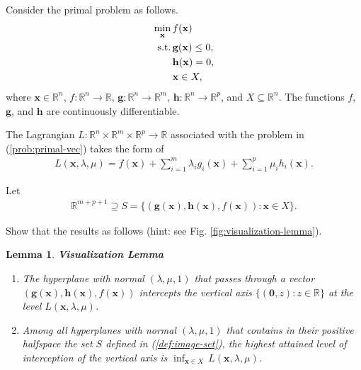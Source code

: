 \documentclass[11pt,letter,notitlepage]{article}
\newtheorem{lemma}{Lemma}
\begin{document}
\begin{solution}

\end{solution}

\newpage
\begin{exercise}
	Consider the primal problem as follows.
	\begin{align}\label{prob:primal-vec}
		\min_{\mathbf{x}}\, & f(\mathbf{x})                \\ \nonumber
		{\rm s.t.}\,        & \mathbf{g}(\mathbf{x})\leq0, \\ \nonumber
		                    & \mathbf{h}(\mathbf{x})=0,    \\ \nonumber
		                    & \mathbf{x}\in X,
	\end{align}
	where $\mathbf{x}\in\mathbb{R}^n$, $f:\mathbb{R}^n\rightarrow\mathbb{R}$, $\mathbf{g}:\mathbb{R}^n\rightarrow\mathbb{R}^m$, $\mathbf{h}:\mathbb{R}^n\rightarrow\mathbb{R}^p$, and $X\subseteq\mathbb{R}^n$. The functions $f$, $\mathbf{g}$, and $\mathbf{h}$ are continuously differentiable.

	The Lagrangian $L:\mathbb{R}^n\times \mathbb{R}^m\times \mathbb{R}^p\rightarrow\mathbb{R}$ associated with the problem in (\ref{prob:primal-vec}) takes the form of
	\begin{align}\label{def:Lagrangian}
		L(\mathbf{x},\lambda,\mu)=f(\mathbf{x})+\sum_{i=1}^m\lambda_ig_i(\mathbf{x})+\sum_{i=1}^p\mu_ih_i(\mathbf{x}).
	\end{align}

	Let
	\begin{align}\label{def:image-set}
		\mathbb{R}^{m+p+1}\supseteq S=\{(\mathbf{g}(\mathbf{x}),\mathbf{h}(\mathbf{x}),f(\mathbf{x})):\mathbf{x}\in X\}.
	\end{align}

	Show that the results as follows (hint: see Fig. \ref{fig:visualization-lemma}).

	\begin{lemma}
		\textbf{\textup {Visualization Lemma}}
		\begin{enumerate}
			\item The hyperplane with normal $(\lambda,\mu,1)$ that passes through a vector $(\mathbf{g}(\mathbf{x}),\mathbf{h}(\mathbf{x}),f(\mathbf{x}))$ intercepts the vertical axis $\{(\mathbf{0},z):z\in\mathbb{R}\}$ at the level $L(\mathbf{x},\lambda,\mu)$.

			\item Among all hyperplanes with normal $(\lambda,\mu,1)$ that contains in their positive halfspace the set $S$ defined in (\ref{def:image-set}), the highest attained level of interception of the vertical axis is $\inf_{\mathbf{x}\in X}\,L(\mathbf{x},\lambda,\mu)$.


\end{enumerate}
\end{lemma}
\end{exercise}
\end{document}
